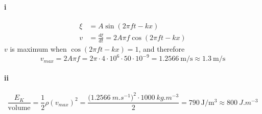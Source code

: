 \paragraph{i}
\begin{equation*}
    \begin{split}
         \xi &= A \sin \left( 2\pi f t - kx \right)\\
         v &= \frac{d\xi}{dt} = 2A\pi f  \cos \left( 2\pi f t - kx \right)
    \end{split}
\end{equation*}
$v$ is maximum when $\cos \left( 2\pi f t - kx \right) = 1$, and therefore
\begin{equation}
    v_{max} = 2A\pi f = 2 \pi \cdot 4 \cdot 10^{6} \cdot 50 \cdot 10^{-9} = \SI{1.2566}{\metre\per\second} \approx \SI{1.3}{\metre\per\second}
\end{equation}

\paragraph{ii}
\begin{equation}
    \frac{E_K}{\text{volume}} = \frac{1}{2} \rho {(v_{max})}^2 = \frac{ { (\SI{1.2566}{m.s^{-1}) }^2 } \cdot \SI{1000}{kg.m^{-3}}}{2} = \SI{790}{\joule\per\cubic\metre} \approx \SI{800}{J.m^{-3}}
\end{equation}
